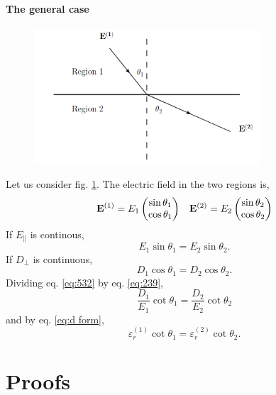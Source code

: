 \documentclass{book}
\begin{document}
\subsubsection{The general case}
\begin{figure}
	\centering
	\includegraphics[width=0.75\textwidth]{interface1.png}
	\caption{}
	\label{fig:interface2}
\end{figure}
Let us consider fig. \ref{fig:interface2}. The electric field in the two regions is,
\begin{align}
	\vb{E}^{(1)} = E_1\begin{pmatrix}
		\sin\theta_1 \\ \cos\theta_1
	\end{pmatrix} && \vb{E}^{(2)} = E_2\begin{pmatrix}
	\sin\theta_2 \\ \cos\theta_2
	\end{pmatrix}
\end{align}
If $E_{\parallel}$ is continous,
\begin{equation}
	E_1\sin\theta_1 = E_2\sin\theta_2. \label{eq:239}
\end{equation}
If $D_{\perp}$ is continuous,
\begin{equation}
	D_1\cos\theta_1 = D_2\cos\theta_2. \label{eq:532}
\end{equation}
Dividing eq. \eqref{eq:532} by eq. \eqref{eq:239}, 
\begin{equation}
	\frac{D_1}{E_1}\cot\theta_1 = \frac{D_2}{E_2}\cot\theta_2
\end{equation}
and by eq. \eqref{eq:d form},
\begin{equation}
	\boxed{\varepsilon_r^{(1)}\cot\theta_1 = \varepsilon_r^{(2)}\cot\theta_2}.
\end{equation}
\appendix
\chapter{Proofs}
\end{document}
